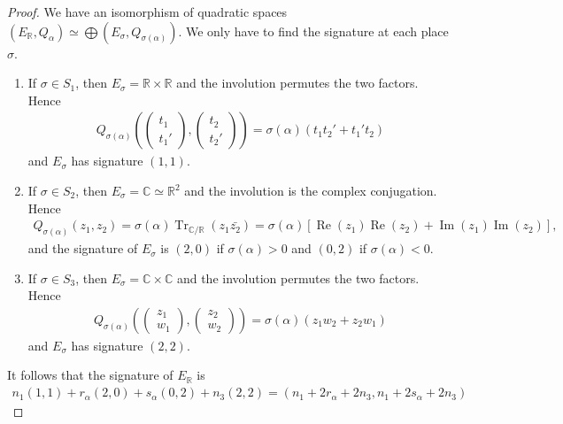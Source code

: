 \documentclass[11pt]{article} %
\newcommand{\8}{\infty}
\newcommand{\R}{\mathbb{R}}
\newcommand{\C}{\mathbb{C}}
\newcommand{\Tr}{\operatorname{Tr}}
\newcommand{\re}{\operatorname{Re}}
\newcommand{\im}{\operatorname{Im}}
\theoremstyle{mytheoremstyle}
\theoremstyle{remark}
\numberwithin{equation}{section}
\begin{document}
\begin{proof}
We have an isomorphism of quadratic spaces $(E_\R, Q_\alpha) \simeq \bigoplus (E_\sigma,Q_{\sigma(\alpha)})$. We only have to find the signature at each place $\sigma$. 
\begin{enumerate}
    \item If $\sigma \in S_1$, then $E_\sigma=\R \times \R$ and the involution permutes the two factors. Hence 
    \begin{align}
        Q_{\sigma(\alpha)}\left ( \begin{pmatrix}
            t_1 \\ t_1'
        \end{pmatrix},\begin{pmatrix}
            t_2 \\ t_2'
        \end{pmatrix}\right )=\sigma(\alpha)(t_1t_2'+t_1't_2)
    \end{align}
    and $E_\sigma$ has signature $(1,1)$.
    \item If $\sigma \in S_2$, then $E_\sigma=\C \simeq \R^2$ and the involution is the complex conjugation. Hence 
    \begin{align}
        Q_{\sigma(\alpha)}\left ( z_1,z_2\right )=\sigma(\alpha)\Tr_{\C/\R}(z_1\bar{z_2})=\sigma(\alpha)\left [\re(z_1)\re(z_2)+\im(z_1)\im(z_2) \right ],
    \end{align}
    and the signature of $E_\sigma$ is $(2,0)$ if $\sigma(\alpha)>0$ and $(0,2)$ if $\sigma(\alpha)<0$.
    \item If $\sigma \in S_3$, then $E_\sigma=\C\times \C$ and the involution permutes the two factors. Hence 
    \begin{align}
        Q_{\sigma(\alpha)}\left ( \begin{pmatrix}
            z_1 \\ w_1
        \end{pmatrix},\begin{pmatrix}
            z_2 \\ w_2
        \end{pmatrix}\right )=\sigma(\alpha)(z_1w_2+z_2w_1)
    \end{align}
    and $E_\sigma$ has signature $(2,2)$. 
\end{enumerate}
It follows that the signature of $E_\R$ is
\begin{align}
    n_1(1,1)+r_\alpha(2,0)+s_\alpha(0,2)+n_3(2,2)=(n_1+2r_\alpha+2n_3,n_1+2s_\alpha+2n_3)
\end{align}
\end{proof}
\end{document}

